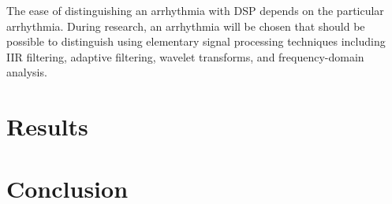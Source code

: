 \documentclass[12pt,letter]{article}
\begin{document}
The ease of distinguishing an arrhythmia with DSP depends on the particular
arrhythmia.  During research, an arrhythmia will be chosen that should be
possible to distinguish using elementary signal processing techniques including
IIR filtering, adaptive filtering, wavelet transforms, and frequency-domain
analysis.  

\section{Results}

\section{Conclusion}



\end{document}
